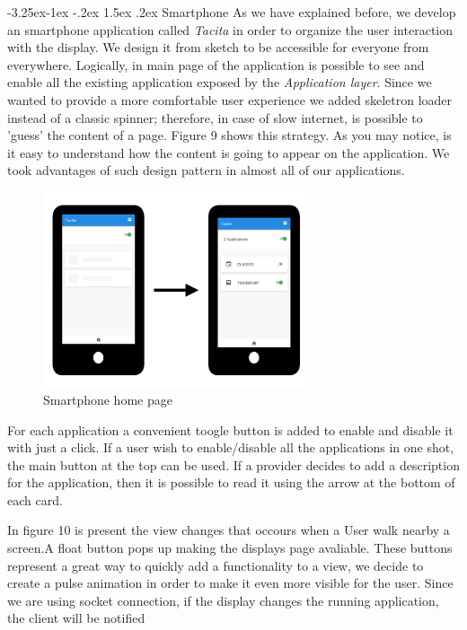 \documentclass[]{usiinfbachelorproject}
\makeatletter
\newcommand\subsubsection{\@startsection{subsubsection}{3}{\z@}%
                {-3.25ex\@plus -1ex \@minus -.2ex}%
                {1.5ex \@plus .2ex}%
                {\normalfont\normalsize\bfseries}}
\makeatother
\begin{document}
\subsubsection{Smartphone}
As we have explained before, we develop an smartphone application called \emph{Tacita} in order to organize the user interaction with the display. We design it from sketch to be accessible for everyone from everywhere. 
Logically, in main page of the application is possible to see and enable all the existing application exposed by the \emph{Application layer}. Since we wanted to provide a more comfortable user experience we added skeletron loader instead of a classic spinner; therefore, in case of slow internet, is possible to 'guess' the content of a page. Figure 9 shows this strategy. As you may notice, is it easy to understand how the content is going to appear on the application. We took advantages of such design pattern in almost all of our applications.
\begin{figure}[H]
\centering
\includegraphics[width=0.7\textwidth]{./images/smartphone_loading_applications}
\caption{Smartphone home page}
\end{figure}

For each application a convenient toogle button is added to enable and disable it with just a click. If a user wish to enable/disable all the applications in one shot, the main button at the top can be used. If a provider decides to add a description for the application, then it is possible to read it using the arrow at the bottom of each card.

In figure 10 is present the view changes that occours when a User walk nearby a screen.A float button pops up making the displays page avaliable. These buttons represent a great way to quickly add a functionality to a view, we decide to create a pulse animation in order to make it even more visible for the user. Since we are using socket connection, if the display changes the running application, the client will be notified
\end{document}
